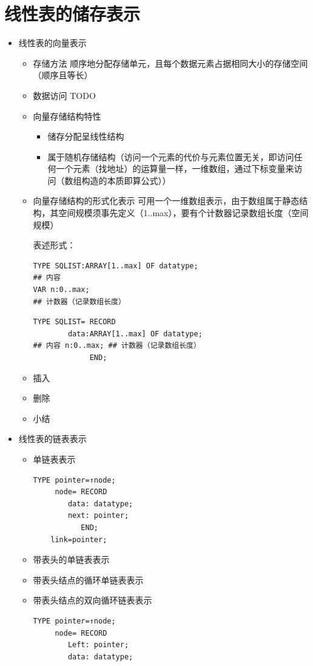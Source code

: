 \documentclass[AutoFakeBold]{LZUThesis2007}
\begin{document}
	\section{线性表的储存表示}
\begin{itemize}
	\item 线性表的向量表示
		\begin{itemize}
			\item 存储方法
			顺序地分配存储单元，且每个数据元素占据相同大小的存储空间（顺序且等长）

			\item 数据访问
			TODO
			\item 向量存储结构特性
				\begin{itemize}
					\item 储存分配呈线性结构
					\item 属于随机存储结构（访问一个元素的代价与元素位置无关，即访问任何一个元素（找地址）的运算量一样，一维数组，通过下标变量来访问（数组构造的本质即算公式））

				\end{itemize}
			\item 向量存储结构的形式化表示
			可用一个一维数组表示，由于数组属于静态结构，其空间规模须事先定义（1..max），要有个计数器记录数组长度（空间规模）

			表述形式：
\begin{lstlisting}
TYPE SQLIST:ARRAY[1..max] OF datatype;
## 内容
VAR n:0..max;	
## 计数器（记录数组长度）
\end{lstlisting}
\begin{lstlisting}
TYPE SQLIST= RECORD 
		data:ARRAY[1..max] OF datatype;
## 内容 n:0..max; ## 计数器（记录数组长度） 
             END;
\end{lstlisting}
			\item 插入
			\item 删除
			\item 小结
		\end{itemize}

	\item 线性表的链表表示
		\begin{itemize}
			\item 单链表表示
\begin{lstlisting}
TYPE pointer=↑node;
     node= RECORD 
		data: datatype;
		next: pointer;
           END; 
	link=pointer;
\end{lstlisting}
			\item 带表头的单链表表示
			\item 带表头结点的循环单链表表示
			\item 带表头结点的双向循环链表表示
\begin{lstlisting}
TYPE pointer=↑node;
     node= RECORD 
		Left: pointer;
		data: datatype;
			

\end{lstlisting}
\end{itemize}
\end{itemize}
\end{document}
